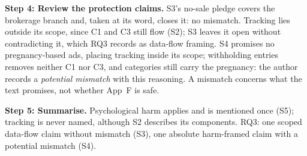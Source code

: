 \documentclass[sigconf,nonacm,natbib=false]{acmart}
\begin{document}
\textbf{Step 4: Review the protection claims.} S3's no-sale pledge covers the
brokerage branch and, taken at its word, closes it: no mismatch. Tracking lies
outside its scope, since C1 and C3 still flow (S2); S3 leaves it open without
contradicting it, which RQ3 records as data-flow framing. S4 promises no
pregnancy-based ads, placing tracking inside its scope; withholding entries
removes neither C1 nor C3, and categories still carry the pregnancy: the
author records a \emph{potential mismatch} with this reasoning. A mismatch
concerns what the text promises, not whether App~F is safe.

\textbf{Step 5: Summarise.} Psychological harm applies and is mentioned once
(S5); tracking is never named, although S2 describes its components. RQ3: one
scoped data-flow claim without mismatch (S3), one absolute harm-framed claim
with a potential mismatch (S4).
\end{document}
